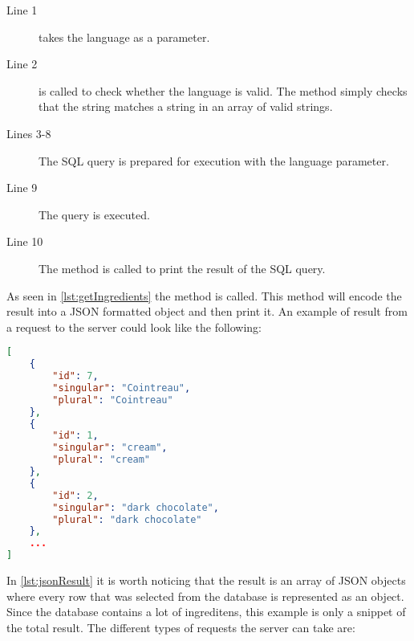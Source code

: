 \begin{description}
\item[Line 1]  takes the language as a parameter.
\item[Line 2]  is called to check whether the language is valid. The method simply checks that the string matches a string in an array of valid strings.
\item[Lines 3-8] The SQL query is prepared for execution with the language parameter.
\item[Line 9] The query is executed.
\item[Line 10] The  method is called to print the result of the SQL query.
\end{description}

As seen in \autoref{lst:getIngredients} the method  is called. This method will encode the result into a JSON formatted object and then print it. An example of result from a request to the server could look like the following:

\begin{lstlisting}[language=json, label=lst:jsonResult, caption=Example result from \colorbox{background}{getIngredients()}]
[
    {
        "id": 7,
        "singular": "Cointreau",
        "plural": "Cointreau"
    },
    {
        "id": 1,
        "singular": "cream",
        "plural": "cream"
    },
    {
        "id": 2,
        "singular": "dark chocolate",
        "plural": "dark chocolate"
    },
    ...
]
\end{lstlisting}

In \autoref{lst:jsonResult} it is worth noticing that the result is an array of JSON objects where every row that was selected from the database is represented as an object. Since the database contains a lot of ingreditens, this example is only a snippet of the total result. The different types of requests the server can take are:

